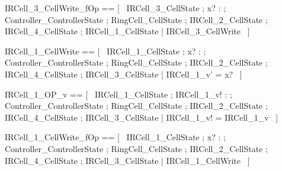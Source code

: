 \documentclass{article}
\begin{document}
\begin{zed}
	IRCell\_3\_CellWrite\_fOp == [~  \Xi IRCell\_3\_CellState ; x? : \nat ; \Xi Controller\_ControllerState ; \Xi RingCell\_CellState ; \Xi IRCell\_2\_CellState ; \Xi IRCell\_4\_CellState ; \Xi IRCell\_1\_CellState | \lnot \pre IRCell\_3\_CellWrite  ~]
\end{zed}

\begin{zed}
	IRCell\_1\_CellWrite == [~  \Delta IRCell\_1\_CellState ; x? : \nat ; \Xi Controller\_ControllerState ; \Xi RingCell\_CellState ; \Xi IRCell\_2\_CellState ; \Xi IRCell\_4\_CellState ; \Xi IRCell\_3\_CellState | IRCell\_1\_v' = x?  ~]
\end{zed}

\begin{zed}
	IRCell\_1\_OP\_v == [~  \Xi IRCell\_1\_CellState ; IRCell\_1\_v! : \nat ; \Xi Controller\_ControllerState ; \Xi RingCell\_CellState ; \Xi IRCell\_2\_CellState ; \Xi IRCell\_4\_CellState ; \Xi IRCell\_3\_CellState | IRCell\_1\_v! = IRCell\_1\_v  ~]
\end{zed}

\begin{zed}
	IRCell\_1\_CellWrite\_fOp == [~  \Xi IRCell\_1\_CellState ; x? : \nat ; \Xi Controller\_ControllerState ; \Xi RingCell\_CellState ; \Xi IRCell\_2\_CellState ; \Xi IRCell\_4\_CellState ; \Xi IRCell\_3\_CellState | \lnot \pre IRCell\_1\_CellWrite  ~]
\end{zed}
\end{document}
